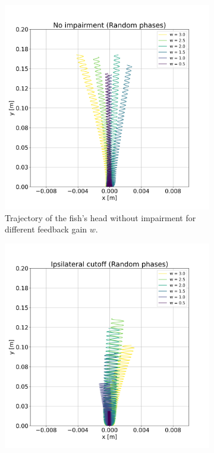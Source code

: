 \documentclass{cmc}
\begin{document}
\begin{figure}[H]
    \centering
    \begin{subfigure}[t]{0.48\linewidth}
        \centering
        \includegraphics[width=\linewidth]{our_figures/No impairment_random.png}
        \caption{Trajectory of the fish's head without impairment for different feedback gain $w$.}
        \label{fig:no_impairment_random}
    \end{subfigure}
    \hfill
    \begin{subfigure}[t]{0.48\linewidth}
        \centering
        \includegraphics[width=\linewidth]{our_figures/Ipsilateral cutoff_random.png}

\end{subfigure}
\end{figure}
\end{document}
